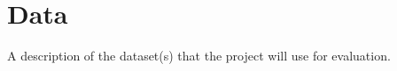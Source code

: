 \section{Data}
\label{sec:data}

A description of the dataset(s) that the project will use for evaluation.